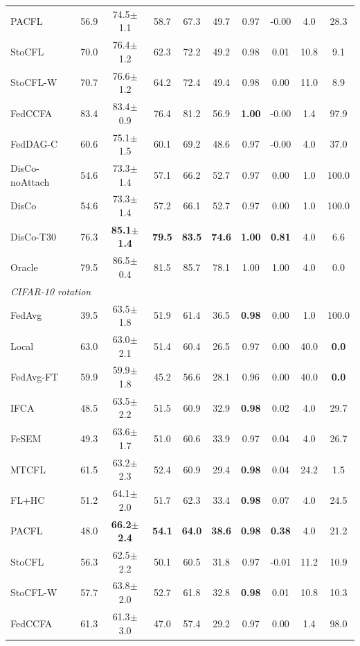 \begin{tabular}{lccccccccc}
PACFL & 56.9 & 74.5$\pm$1.1 & 58.7 & 67.3 & 49.7 & 0.97 & -0.00 & 4.0 & 28.3 \\
StoCFL & 70.0 & 76.4$\pm$1.2 & 62.3 & 72.2 & 49.2 & 0.98 & 0.01 & 10.8 & 9.1 \\
StoCFL-W & 70.7 & 76.6$\pm$1.2 & 64.2 & 72.4 & 49.4 & 0.98 & 0.00 & 11.0 & 8.9 \\
FedCCFA & 83.4 & 83.4$\pm$0.9 & 76.4 & 81.2 & 56.9 & \textbf{1.00} & -0.00 & 1.4 & 97.9 \\
FedDAG-C & 60.6 & 75.1$\pm$1.5 & 60.1 & 69.2 & 48.6 & 0.97 & -0.00 & 4.0 & 37.0 \\
DisCo-noAttach & 54.6 & 73.3$\pm$1.4 & 57.1 & 66.2 & 52.7 & 0.97 & 0.00 & 1.0 & 100.0 \\
DisCo & 54.6 & 73.3$\pm$1.4 & 57.2 & 66.1 & 52.7 & 0.97 & 0.00 & 1.0 & 100.0 \\
DisCo-T30 & 76.3 & \textbf{85.1$\pm$1.4} & \textbf{79.5} & \textbf{83.5} & \textbf{74.6} & \textbf{1.00} & \textbf{0.81} & 4.0 & 6.6 \\
Oracle & 79.5 & 86.5$\pm$0.4 & 81.5 & 85.7 & 78.1 & 1.00 & 1.00 & 4.0 & 0.0 \\
\midrule
\multicolumn{10}{l}{\textit{CIFAR-10 rotation}}\\
FedAvg & 39.5 & 63.5$\pm$1.8 & 51.9 & 61.4 & 36.5 & \textbf{0.98} & 0.00 & 1.0 & 100.0 \\
Local & 63.0 & 63.0$\pm$2.1 & 51.4 & 60.4 & 26.5 & 0.97 & 0.00 & 40.0 & \textbf{0.0} \\
FedAvg-FT & 59.9 & 59.9$\pm$1.8 & 45.2 & 56.6 & 28.1 & 0.96 & 0.00 & 40.0 & \textbf{0.0} \\
IFCA & 48.5 & 63.5$\pm$2.2 & 51.5 & 60.9 & 32.9 & \textbf{0.98} & 0.02 & 4.0 & 29.7 \\
FeSEM & 49.3 & 63.6$\pm$1.7 & 51.0 & 60.6 & 33.9 & 0.97 & 0.04 & 4.0 & 26.7 \\
MTCFL & 61.5 & 63.2$\pm$2.3 & 52.4 & 60.9 & 29.4 & \textbf{0.98} & 0.04 & 24.2 & 1.5 \\
FL+HC & 51.2 & 64.1$\pm$2.0 & 51.7 & 62.3 & 33.4 & \textbf{0.98} & 0.07 & 4.0 & 24.5 \\
PACFL & 48.0 & \textbf{66.2$\pm$2.4} & \textbf{54.1} & \textbf{64.0} & \textbf{38.6} & \textbf{0.98} & \textbf{0.38} & 4.0 & 21.2 \\
StoCFL & 56.3 & 62.5$\pm$2.2 & 50.1 & 60.5 & 31.8 & 0.97 & -0.01 & 11.2 & 10.9 \\
StoCFL-W & 57.7 & 63.8$\pm$2.0 & 52.7 & 61.8 & 32.8 & \textbf{0.98} & 0.01 & 10.8 & 10.3 \\
FedCCFA & 61.3 & 61.3$\pm$3.0 & 47.0 & 57.4 & 29.2 & 0.97 & 0.00 & 1.4 & 98.0 \\

\end{tabular}
